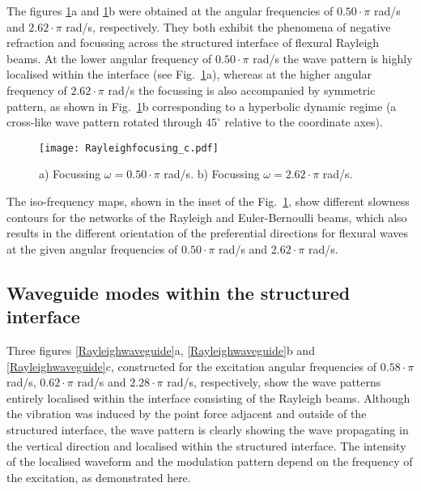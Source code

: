 \documentclass[11pt]{article}
\begin{document}
The figures \ref{Rayleighfocusing}a and \ref{Rayleighfocusing}b were obtained at the angular frequencies of $0.50\!\cdot\!\pi$ rad/s and $2.62\!\cdot\!\pi$ rad/s, respectively. They both exhibit the phenomena of negative refraction and focussing across the structured interface of flexural Rayleigh beams.
At the lower angular frequency of $0.50\!\cdot\!\pi$ rad/s the wave pattern is highly localised within the interface (see Fig.~\ref{Rayleighfocusing}a), whereas at the higher angular frequency of $2.62\!\cdot\!\pi$ rad/s the focussing is also accompanied by symmetric pattern, as shown in Fig.~\ref{Rayleighfocusing}b corresponding to a hyperbolic dynamic regime (a cross-like wave pattern rotated through $45^\circ$ relative to the coordinate axes).

\begin{figure}[!htb]
\centering
\texttt{[image: Rayleighfocusing\_c.pdf]}
\caption{\footnotesize
a) Focussing $\omega=0.50\!\cdot\!\pi$ rad/s. b) Focussing $\omega=2.62\!\cdot\!\pi$ rad/s.}
\label{Rayleighfocusing}
\end{figure}

The iso-frequency maps, shown in the inset of the Fig.~\ref{Rayleighfocusing}, show different slowness contours for the networks of the Rayleigh and Euler-Bernoulli beams, which also results in the different orientation of the preferential directions for flexural waves at the given angular frequencies of $0.50\!\cdot\!\pi$ rad/s and $2.62\!\cdot\!\pi$ rad/s.


\subsection{Waveguide modes within the structured interface }

Three figures \ref{Rayleighwaveguide}a, \ref{Rayleighwaveguide}b and \ref{Rayleighwaveguide}c, constructed for the excitation angular frequencies of
$0.58\!\cdot\!\pi$ rad/s, $0.62\!\cdot\!\pi$ rad/s and $2.28\!\cdot\!\pi$ rad/s, respectively, show the wave patterns entirely localised within the interface consisting of the Rayleigh beams. Although the vibration was induced by the point force adjacent and outside of the structured interface, the wave pattern is clearly showing the wave propagating in the vertical direction and localised within the structured interface. The intensity of the localised waveform and the modulation pattern depend on the frequency of the excitation, as demonstrated here.
\end{document}
